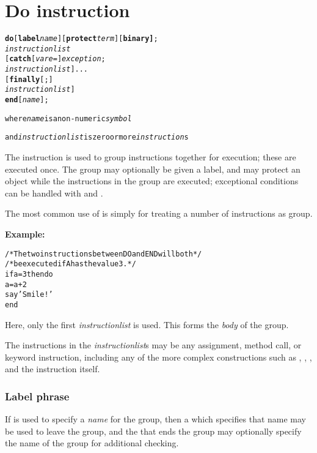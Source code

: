 \chapter{Do instruction}\label{refdo}
\begin{shaded}
\begin{alltt}
\textbf{do} [\textbf{label} \emph{name}] [\textbf{protect} \emph{term}] [\textbf{binary]};
        \emph{instructionlist}
    [\textbf{catch} [\emph{vare} =] \emph{exception};
        \emph{instructionlist}]...
    [\textbf{finally}[;]
        \emph{instructionlist}]
    \textbf{end} [\emph{name}];

where \emph{name} is a non-numeric \emph{symbol}

and \emph{instructionlist} is zero or more \emph{instruction}s
\end{alltt}
\end{shaded}
 The  instruction is used to group instructions together for
execution; these are executed once.
The group may optionally be given a label, and may protect an object
while the instructions in the group are executed; exceptional conditions
can be handled with  and .
 
The most common use of  is simply for treating a number of
instructions as group.

\textbf{Example:}
\begin{alltt}
/* The two instructions between DO and END will both */
/* be executed if A has the value 3.                 */
if a=3 then do
  a=a+2
  say 'Smile!'
  end
\end{alltt}
Here, only the first \emph{instructionlist} is used.
This forms the \emph{body} of the group.
 
The instructions in the \emph{instructionlist}s may be any assignment,
method call, or keyword instruction, including any of the more complex
constructions such as , , , and
the  instruction itself.
\subsection{Label phrase}
 
If  is used to specify a \emph{name} for the group,
then a  which specifies that name may be used to leave the
group, and the  that ends the group may optionally specify
the name of the group for additional checking.

